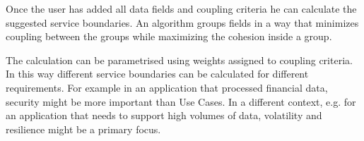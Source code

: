 Once the user has added all data fields and coupling criteria he can calculate the suggested service boundaries. An algorithm groups fields in a way that minimizes coupling between the groups while maximizing the cohesion inside a group.

The calculation can be parametrised using weights assigned to coupling criteria. In this way different service boundaries can be calculated for different requirements. For example in an application that processed financial data, security might be more important than Use Cases. In a different context, e.g. for an application that needs to support high volumes of data, volatility and resilience might be a primary focus.